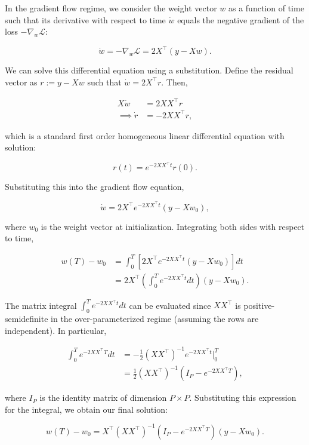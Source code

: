 In the gradient flow regime, we consider the weight vector $w$ as a function of time such that its derivative with respect to time $\dot{w}$ equals the negative gradient of the loss $-\nabla_w \mathcal{L}$:

$$
\dot{w}= -\nabla_w \mathcal{L} = 2X^\top (y-Xw).
$$

We can solve this differential equation using a substitution. Define the residual vector as $r:=y-Xw$ such that $\dot{w} = 2X^\top r$. Then, 

\begin{align*}
    X\dot{w} &= 2XX^\top r \\
    \implies \dot{r}&= -2XX^\top r,
\end{align*}

which is a standard first order homogeneous linear differential equation with solution:

$$
r(t) = e^{-2XX^\top t}r(0).
$$

Substituting this into the gradient flow equation,

$$
\dot{w} = 2X^\top e^{-2XX^\top t}(y-Xw_0),
$$

where $w_0$ is the weight vector at initialization. Integrating both sides with respect to time,

\begin{align*}
    w(T)-w_0 &= \int^T_0 \left[2X^\top e^{-2XX^\top t}(y-Xw_0) \right]dt \\
    &= 2X^\top \left(\int^T_0 e^{-2XX^\top t}dt \right)(y-Xw_0).
\end{align*}

The matrix integral $\int^T_0 e^{-2XX^\top t}dt$ can be evaluated since $XX^\top$ is positive-semidefinite in the over-parameterized regime (assuming the rows are independent). In particular,

\begin{align*}
    \int^T_0 e^{-2XX^\top T}dt&=-\frac{1}{2}(XX^\top)^{-1}e^{-2XX^\top t}\Big |^T_0 \\
    &= \frac{1}{2}(XX^\top)^{-1}(I_P-e^{-2XX^\top T}),
\end{align*}

where $I_P$ is the identity matrix of dimension $P\times P$. Substituting this expression for the integral, we obtain our final solution:

\begin{equation}
    w(T) - w_0= X^\top(XX^\top)^{-1}(I_P-e^{-2XX^\top T})(y-Xw_0).
    \label{linreg}
\end{equation}

